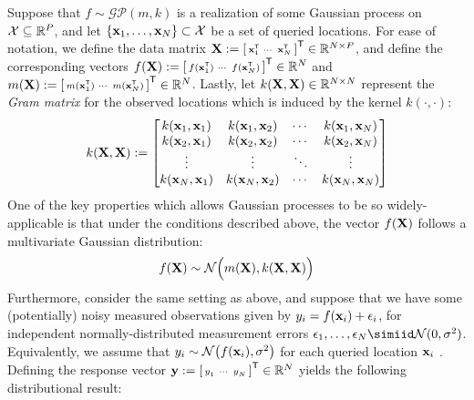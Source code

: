 \documentclass[10pt]{article}
\numberwithin{equation}{section}
\newcommand{\calGP}{\mathcal{GP}}
\begin{document}
Suppose that $f \sim \calGP(m, k)$ is a realization of some Gaussian process on $\mathcal{X} \subseteq \mathbb{R}^{P}$, and let $\{\mathbf{x}_{1}, \dots, \mathbf{x}_{N}\} \subset \mathcal{X}$ be a set of queried locations. For ease of notation, we define the data matrix $\mathbf{X} := \begin{bsmallmatrix}
    \mathbf{x}_{1}^{\scriptscriptstyle{\mathsf{T}}} &
    \cdots &
    \mathbf{x}_{N}^{\scriptscriptstyle{\mathsf{T}}}
\end{bsmallmatrix}^{\scriptstyle{\mathsf{T}}} \in \mathbb{R}^{N \times P}$, and define the corresponding vectors $f(\mathbf{X}) := \begin{bsmallmatrix}
    f(\mathbf{x}_{1}^{\scriptscriptstyle{\mathsf{T}}}) &
    \cdots &
    f(\mathbf{x}_{N}^{\scriptscriptstyle{\mathsf{T}}})
\end{bsmallmatrix}^{\scriptstyle{\mathsf{T}}} \in \mathbb{R}^{N}$ and $m(\mathbf{X}) := \begin{bsmallmatrix}
    m(\mathbf{x}_{1}^{\scriptscriptstyle{\mathsf{T}}}) &
    \cdots &
    m(\mathbf{x}_{N}^{\scriptscriptstyle{\mathsf{T}}})
\end{bsmallmatrix}^{\scriptstyle{\mathsf{T}}} \in \mathbb{R}^{N}$. Lastly, let $k(\mathbf{X}, \mathbf{X}) \in \mathbb{R}^{N \times N}$ represent the \emph{Gram matrix} for the observed locations which is induced by the kernel $k(\cdot, \cdot)$:
\begin{equation}
\label{eq:GP-gram-matrix}
    k(\mathbf{X}, \mathbf{X}) := \begin{bmatrix}
        k(\mathbf{x}_{1}, \mathbf{x}_{1}) & k(\mathbf{x}_{1}, \mathbf{x}_{2}) & \cdots & k(\mathbf{x}_{1}, \mathbf{x}_{N})\\
        k(\mathbf{x}_{2}, \mathbf{x}_{1}) & k(\mathbf{x}_{2}, \mathbf{x}_{2}) & \cdots & k(\mathbf{x}_{2}, \mathbf{x}_{N})\\
        \vdots & \vdots & \ddots & \vdots\\
        k(\mathbf{x}_{N}, \mathbf{x}_{1}) & k(\mathbf{x}_{N}, \mathbf{x}_{2}) & \cdots & k(\mathbf{x}_{N}, \mathbf{x}_{N})
    \end{bmatrix}
\end{equation}
One of the key properties which allows Gaussian processes to be so widely-applicable is that under the conditions described above, the vector $f(\mathbf{X})$ follows a multivariate Gaussian distribution:
\begin{equation}
\label{eq:GP-fun-distribution}
    f(\mathbf{X}) \sim \mathcal{N}\Big(m(\mathbf{X}), k(\mathbf{X}, \mathbf{X})\Big)
\end{equation}
Furthermore, consider the same setting as above, and suppose that we have some (potentially) noisy measured observations given by $y_{i} = f(\mathbf{x}_{i}) + \epsilon_{i}$, for independent normally-distributed measurement errors $\epsilon_{1}, \dots, \epsilon_{N} \simiid \calN(0, \sigma^2)$. Equivalently, we assume that $y_{i} \sim \mathcal{N}\big(f(\mathbf{x}_{i}), \sigma^{2}\big)$ for each queried location $\mathbf{x}_{i}$ \citep{GPML-Book-2006}. Defining the response vector $\bfy := \begin{bsmallmatrix}
    y_{1}^{\phantom{{\scriptscriptstyle{\sfT}}}} &
    \cdots &
    y_{N}^{\phantom{{\scriptscriptstyle{\sfT}}}}
\end{bsmallmatrix}^{\sfTsmall} \in \bbR^{N}$ yields the following distributional result:
\end{document}

